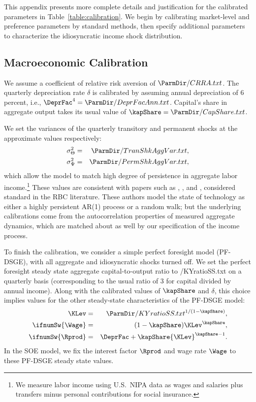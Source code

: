 This appendix presents more complete details and justification for the calibrated parameters in Table~\ref{table:calibration}.  We begin by calibrating market-level and preference parameters by standard methods, then specify additional parameters to characterize the idiosyncratic income shock distribution.

\subsection{Macroeconomic Calibration}
\label{sec:MacroCal}

We assume a coefficient of relative risk aversion of
$
 \ParmDir/CRRA.txt
$. %
The quarterly depreciation rate $\delta$ is calibrated by assuming annual depreciation of 6 percent,
i.e.,
$
\DeprFac^{4}=  \ParmDir/DeprFacAnn.txt
$.  Capital's share in aggregate output takes its usual value of
$
\kapShare=  \ParmDir/CapShare.txt
$.

We set the variances of the quarterly transitory and permanent shocks at the approximate values respectively:
\begin{eqnarray*}
	\sigma^{2}_{\Theta} & = &  \ParmDir/TranShkAggVar.txt ,
	\\ \sigma^{2}_{\Psi}  & =  &  \ParmDir/PermShkAggVar.txt ,
\end{eqnarray*}
which allow the model to match high degree of persistence in aggregate labor income.\footnote{We measure labor income using U.S.\ NIPA data as wages and salaries plus transfers minus personal contributions for social insurance.} These values are consistent with papers such as \cite{jermannProduction}, \cite{bcfHabits}, and \cite{ckmCritique}, considered standard  in the RBC literature. These authors model the state of technology as either a highly persistent AR(1) process or a random walk; but the underlying calibrations come from the autocorrelation properties of measured aggregate dynamics, which are matched about as well by our specification of the income process.

To finish the calibration, we consider a simple perfect foresight model (PF-DSGE), with all aggregate and idiosyncratic shocks turned off.  We set the perfect foresight steady state aggregate capital-to-output ratio to  \ParmDir/KYratioSS.txt on a quarterly basis (corresponding to the usual ratio of 3 for capital divided by annual income).  Along with the calibrated values of $\kapShare$ and $\delta$, this choice implies values for the other steady-state characteristics of the PF-DSGE model:
\begin{eqnarray*}
	{\KLev} & = &  \ParmDir/KYratioSS.txt ^{1/(1-\kapShare)},
	\\ \ifnumSw {\Wage} & = & (1-\kapShare) {\KLev}^{\kapShare},
	\\ \ifnumSw {\Rprod} & = & \DeprFac+\kapShare {\KLev}^{\kapShare-1}
	.
\end{eqnarray*}
In the SOE model, we fix the interest factor $\Rprod$ and wage rate $\Wage$ to these PF-DSGE steady state values.

